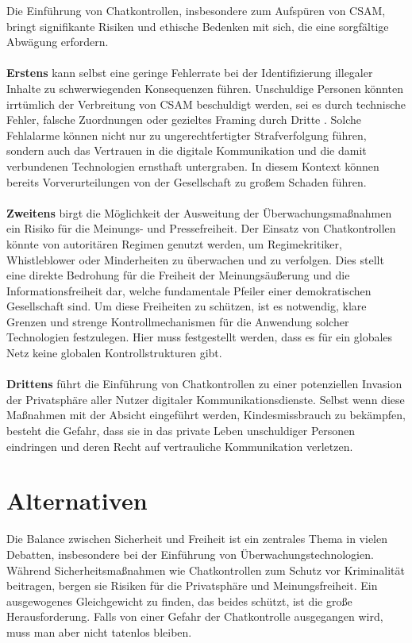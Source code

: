 \documentclass[a4paper]{article}
\begin{document}
Die Einführung von Chatkontrollen, insbesondere zum Aufspüren von CSAM, bringt signifikante Risiken und ethische Bedenken mit sich, die eine sorgfältige Abwägung erfordern.
\\\\
\textbf{Erstens} kann selbst eine geringe Fehlerrate bei der Identifizierung illegaler Inhalte zu schwerwiegenden Konsequenzen führen. Unschuldige Personen könnten irrtümlich der Verbreitung von CSAM beschuldigt werden, sei es durch technische Fehler, falsche Zuordnungen oder gezieltes Framing durch Dritte \cite{bugs_in_our_pockets}. Solche Fehlalarme können nicht nur zu ungerechtfertigter Strafverfolgung führen, sondern auch das Vertrauen in die digitale Kommunikation und die damit verbundenen Technologien ernsthaft untergraben. In diesem Kontext können bereits Vorverurteilungen von der Gesellschaft zu großem Schaden führen. 
\\\\
\textbf{Zweitens} birgt die Möglichkeit der Ausweitung der Überwachungsmaßnahmen ein Risiko für die Meinungs- und Pressefreiheit. Der Einsatz von Chatkontrollen könnte von autoritären Regimen genutzt werden, um Regimekritiker, Whistleblower oder Minderheiten zu überwachen und zu verfolgen. Dies stellt eine direkte Bedrohung für die Freiheit der Meinungsäußerung und die Informationsfreiheit dar, welche fundamentale Pfeiler einer demokratischen Gesellschaft sind. Um diese Freiheiten zu schützen, ist es notwendig, klare Grenzen und strenge Kontrollmechanismen für die Anwendung solcher Technologien festzulegen. Hier muss festgestellt werden, dass es für ein globales Netz keine globalen Kontrollstrukturen gibt. 
\\\\
\textbf{Drittens} führt die Einführung von Chatkontrollen zu einer potenziellen Invasion der Privatsphäre aller Nutzer digitaler Kommunikationsdienste. Selbst wenn diese Maßnahmen mit der Absicht eingeführt werden, Kindesmissbrauch zu bekämpfen, besteht die Gefahr, dass sie in das private Leben unschuldiger Personen eindringen und deren Recht auf vertrauliche Kommunikation verletzen.


\section{Alternativen}
Die Balance zwischen Sicherheit und Freiheit ist ein zentrales Thema in vielen Debatten, insbesondere bei der Einführung von Überwachungstechnologien\cite{letter_chatcontrol, artikel_aufruhr}. Während Sicherheitsmaßnahmen wie Chatkontrollen zum Schutz vor Kriminalität beitragen, bergen sie Risiken für die Privatsphäre und Meinungsfreiheit. Ein ausgewogenes Gleichgewicht zu finden, das beides schützt, ist die große Herausforderung. Falls von einer Gefahr der Chatkontrolle ausgegangen wird, muss man aber nicht tatenlos bleiben.
\end{document}
